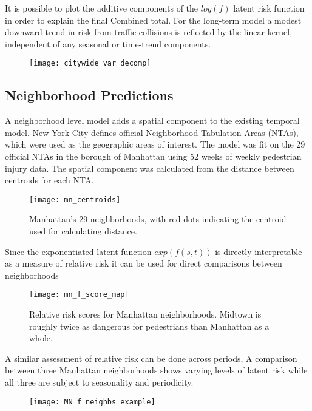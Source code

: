 It is possible to plot the additive components of the $log(f)$ latent risk function in order to explain the final Combined total. For the long-term model a modest downward trend in risk from traffic collisions is reflected by the linear kernel, independent of any seasonal or time-trend components. \par

\begin{figure}[h!]
  \caption{}
  \texttt{[image: citywide\_var\_decomp]}
\end{figure}


 \subsection{Neighborhood Predictions}

 A neighborhood level model adds a spatial component to the existing temporal model.  New York City defines official Neighborhood Tabulation Areas (NTAs), which were used as the geographic areas of interest. The model was fit on the 29 official NTAs in the borough of Manhattan using 52 weeks of weekly pedestrian injury data. The spatial component was calculated from the distance between centroids for each NTA. \par


 \begin{figure}[h!]
   \caption{Manhattan's 29 neighborhoods, with red dots indicating the centroid used for calculating distance.}
   \texttt{[image: mn\_centroids]}
 \end{figure}


Since the exponentiated latent function $exp(f(s,t))$ is directly interpretable as a measure of relative risk it can be used for direct comparisons between neighborhoods \par

 \begin{figure}[h!]
   \caption{Relative risk scores for Manhattan neighborhoods. Midtown is roughly twice as dangerous for pedestrians than Manhattan as a whole.}
   \texttt{[image: mn\_f\_score\_map]}
 \end{figure}

A similar assessment of relative risk can be done across periods, A comparison between three Manhattan neighborhoods shows varying levels of latent risk while all three are subject to seasonality and periodicity.

\begin{figure}[h!]
  \texttt{[image: MN\_f\_neighbs\_example]}
\end{figure}



